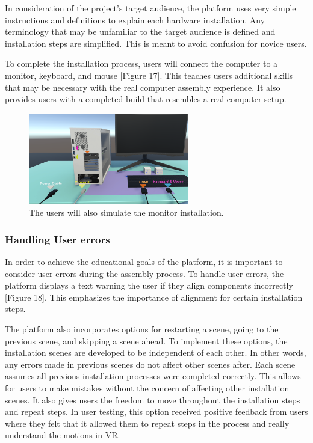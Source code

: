\documentclass[10pt,twocolumn]{article}
\begin{document}
\par In consideration of the project’s target audience, the platform uses very simple instructions and definitions to explain each hardware installation. Any terminology that may be unfamiliar to the target audience is defined and installation steps are simplified. This is meant to avoid confusion for novice users.

\par To complete the installation process, users will connect the computer to a monitor, keyboard, and mouse [Figure 17]. This teaches users additional skills that may be necessary with the real computer assembly experience. It also provides users with a completed build that resembles a real computer setup. 

\begin{figure}
    \centering
    \includegraphics[width=7cm]{images/MonitorSetUp.png}
    \caption{The users will also simulate the monitor installation.}
\end{figure}

\subsubsection{Handling User errors}

\par In order to achieve the educational goals of the platform, it is important to consider user errors during the assembly process. To handle user errors, the platform displays a text warning the user if they align components incorrectly [Figure 18]. This emphasizes the importance of alignment for certain installation steps. 

\par The platform also incorporates options for restarting a scene, going to the previous scene, and skipping a scene ahead. To implement these options, the installation scenes are developed to be independent of each other. In other words, any errors made in previous scenes do not affect other scenes after. Each scene assumes all previous installation processes were completed correctly. This allows for users to make mistakes without the concern of affecting other installation scenes. It also gives users the freedom to move throughout the installation steps and repeat steps. In user testing, this option received positive feedback from users where they felt that it allowed them to repeat steps in the process and really understand the motions in VR. 
\end{document}
